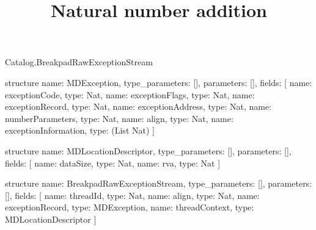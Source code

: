 \begin{lexlean}{Catalog.BreakpadRawExceptionStream}
\title{Natural number addition}
\begin{semanticmodule}
structure{
  name: MDException,
  type_parameters: [],
  parameters: [],
  fields: [
    {name: exceptionCode, type: Nat},
    {name: exceptionFlags, type: Nat},
    {name: exceptionRecord, type: Nat},
    {name: exceptionAddress, type: Nat},
    {name: numberParameters, type: Nat},
    {name: align, type: Nat},
    {name: exceptionInformation, type: (List Nat)}
  ]
}

structure{
  name: MDLocationDescriptor,
  type_parameters: [],
  parameters: [],
  fields: [
    {name: dataSize, type: Nat},
    {name: rva, type: Nat}
  ]
}

structure{
  name: BreakpadRawExceptionStream,
  type_parameters: [],
  parameters: [],
  fields: [
    {name: threadId, type: Nat},
    {name: align, type: Nat},
    {name: exceptionRecord, type: MDException},
    {name: threadContext, type: MDLocationDescriptor}
  ]
}
\end{semanticmodule}
\end{lexlean}
